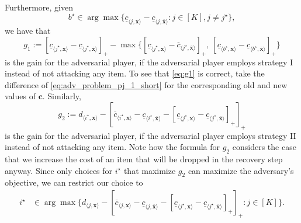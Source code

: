\documentclass[a4paper,11pt,abstracton]{scrartcl}
\theoremstyle{definition}
\theoremstyle{remark}
\begin{document}
Furthermore, given
\begin{equation} 
b^\star \in \arg\max \{ \underline{c}_{\langle j,\pmb{x}\rangle} - \underline{c}_{\langle j, \overline{\pmb{x}}\rangle} : j\in[K], j \neq j^\star\},
\label{eq:bstar}
\end{equation}
we have that
\begin{equation}
g_1 :=   [\underline{c}_{\langle j^\star,\pmb{x}\rangle} - \underline{c}_{\langle j^\star,\overline{\pmb{x}}\rangle}]_+ - \max\{[\underline{c}_{\langle j^\star,\pmb{x}\rangle} - \overline{c}_{\langle j^\star,\overline{\pmb{x}}\rangle}]_+,\ [\underline{c}_{\langle b^\star,\pmb{x}\rangle} - \underline{c}_{\langle b^\star,\overline{\pmb{x}}\rangle}]_+ \} 
\label{eq:g1}
\end{equation}
is the gain for the adversarial player, if the adversarial player employs strategy I instead of not attacking any item. 
To see that \cref{eq:g1} is correct, take the difference of \cref{eq:adv_problem_pj_1_short} for the corresponding old and new values of $\pmb{c}$.
Similarly,
\begin{equation}
 g_2 := d_{\langle i^\star,\pmb{x}\rangle} - [\overline{c}_{\langle i^\star,\pmb{x}\rangle}-\underline{c}_{\langle i^\star,\overline{\pmb{x}}\rangle} - [\underline{c}_{\langle j^\star,\pmb{x}\rangle} - \underline{c}_{\langle j^\star,\overline{\pmb{x}}\rangle}]_+]_+
\label{eq:g2} 
\end{equation}
is the gain for the adversarial player, if the adversarial player employs strategy II instead of not attacking any item.
Note how the formula for $g_2$ considers the case that we increase the cost of an 
item that will be dropped in the recovery step anyway.
Since only choices for $i^\star$ that maximize $g_2$ can maximize the adversary's 
objective, we can restrict our choice to
\begin{align}
  i^\star &\in \arg\max \{ d_{\langle j,\pmb{x}\rangle} - [\overline{c}_{\langle j, \pmb{x} \rangle}-\underline{c}_{\langle j,\overline{\pmb{x}}\rangle} - [\underline{c}_{\langle j^\star,\pmb{x}\rangle} - \underline{c}_{\langle j^\star, \overline{\pmb{x}}\rangle}]_+]_+  : j\in[K] \}.
  \label{eq:istar}
\end{align}
\end{document}
